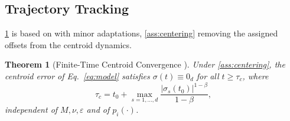 \documentclass[letterpaper, 10 pt, conference]{ieeeconf}
\newtheorem{theorem}{Theorem}
\begin{document}
\subsection{Trajectory Tracking}
\label{sec:trajectory}

\cref{thm:centroid} is based on \cite[Th.~1]{fedele2019kinematic}
with minor adaptations, \cref{ass:centering} removing the assigned
offsets from the centroid dynamics.

\begin{theorem}[Finite-Time Centroid Convergence \cite{fedele2019kinematic}]
\label{thm:centroid}
Under \cref{ass:centering}, the centroid error of Eq.~\eqref{eq:model}
satisfies $\sigma(t)\equiv0_d$ for all $t\ge\tau_c$, where
\begin{equation}
\tau_c = t_0+\max_{s=1,\dots,d}\frac{|\sigma_s(t_0)|^{1-\beta}}{1-\beta},
\label{eq:tauc}
\end{equation}
independent of $M,\nu,\varepsilon$ and of $p_i(\cdot)$.
\end{theorem}
\end{document}
